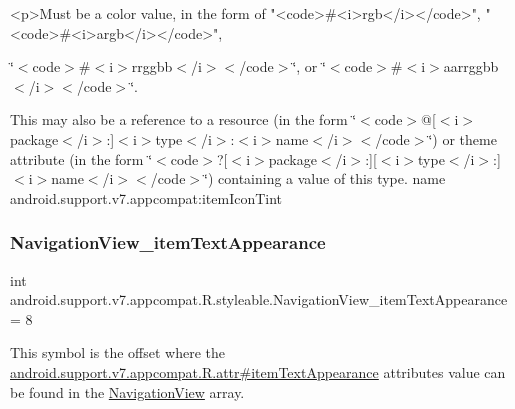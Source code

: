 \begin{DoxyVerb}      <p>Must be a color value, in the form of "<code>#<i>rgb</i></code>", "<code>#<i>argb</i></code>",
\end{DoxyVerb}
 \char`\"{}$<$code$>$\#$<$i$>$rrggbb$<$/i$>$$<$/code$>$\char`\"{}, or \char`\"{}$<$code$>$\#$<$i$>$aarrggbb$<$/i$>$$<$/code$>$\char`\"{}. 

This may also be a reference to a resource (in the form \char`\"{}$<$code$>$@\mbox{[}$<$i$>$package$<$/i$>$\+:\mbox{]}$<$i$>$type$<$/i$>$\+:$<$i$>$name$<$/i$>$$<$/code$>$\char`\"{}) or theme attribute (in the form \char`\"{}$<$code$>$?\mbox{[}$<$i$>$package$<$/i$>$\+:\mbox{]}\mbox{[}$<$i$>$type$<$/i$>$\+:\mbox{]}$<$i$>$name$<$/i$>$$<$/code$>$\char`\"{}) containing a value of this type.  name android.\+support.\+v7.\+appcompat\+:item\+Icon\+Tint \mbox{\label{classandroid_1_1support_1_1v7_1_1appcompat_1_1R_1_1styleable_acbb9457e65af01969c57837ac859986e}} 
\subsubsection{\texorpdfstring{Navigation\+View\+\_\+item\+Text\+Appearance}{NavigationView\_itemTextAppearance}}
{\footnotesize\ttfamily int android.\+support.\+v7.\+appcompat.\+R.\+styleable.\+Navigation\+View\+\_\+item\+Text\+Appearance = 8\hspace{0.3cm}{\ttfamily [static]}}

This symbol is the offset where the \hyperlink{classandroid_1_1support_1_1v7_1_1appcompat_1_1R_1_1attr_a566e6b90192933c84b8d479a1afb59cf}{android.\+support.\+v7.\+appcompat.\+R.\+attr\#item\+Text\+Appearance} attribute\textquotesingle{}s value can be found in the \hyperlink{classandroid_1_1support_1_1v7_1_1appcompat_1_1R_1_1styleable_a52cfb3ba7bdfc8fb2cca459f35c24456}{Navigation\+View} array.

